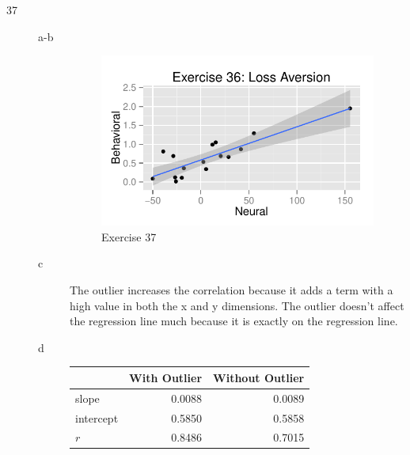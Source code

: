 \documentclass[letterpaper, landscape]{exam}
\begin{document}
\begin{description}

      \item[37]
        \begin{description}
          \item[a-b]
            \begin{figure}[H]
              \centering
              \includegraphics{figures/ex37.pdf}
              \caption{Exercise 37}
            \end{figure}

          \item[c]
            The outlier increases the correlation because it adds a term
            with a high value in both the x and y dimensions.  The outlier
            doesn't affect the regression line much because it is exactly on the
            regression line.

          \item[d]
            \begin{tabular}[H]{lrr}
              \toprule
                        & With Outlier & Without Outlier \\
              \midrule
              slope     & 0.0088       & 0.0089 \\
              intercept & 0.5850       & 0.5858 \\
              $r$       & 0.8486       & 0.7015 \\
              \bottomrule
            \end{tabular}
        \end{description}


\end{description}
\end{document}
